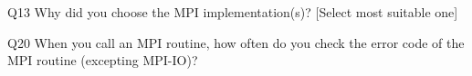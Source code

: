 \begin{description}%
\item{Q13} Why did you choose the MPI implementation(s)? [Select most suitable one]%
\item{Q20} When you call an MPI routine, how often do you check the error code of the MPI routine  (excepting MPI-IO)?%
\end{description}%
